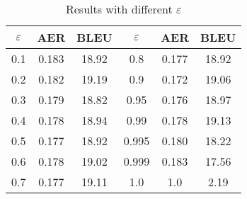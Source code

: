\documentclass[11pt,a4paper]{article}
\begin{document}
\begin{table}[h!]
  \begin{center}
  \begin{tabular}{|c|c|c||c|c|c|}
  \hline 
  $\varepsilon$ & \bf AER &\bf BLEU & $\varepsilon$ & \bf AER &\bf BLEU \\ 
  \hline
  0.1 & 0.183 & 18.92 & 0.8 & 0.177 & 18.92 \\
  \hline
  0.2 & 0.182 & 19.19 & 0.9 & 0.172 & 19.06\\
  \hline
  0.3 & 0.179 & 18.82 & 0.95 & 0.176 & 18.97\\
  \hline
  0.4 & 0.178 & 18.94 & 0.99 & 0.178 & 19.13\\
  \hline
  0.5 & 0.177 & 18.92 & 0.995 & 0.180 & 18.22\\
  \hline
  0.6 & 0.178 & 19.02 & 0.999 & 0.183 & 17.56\\
  \hline
  0.7 & 0.177 & 19.11 & 1.0 & 1.0 & 2.19\\
  \hline
  \end{tabular}
  \end{center}
  \caption{Results with different $\varepsilon$}
  \label{tab:hmm-ep}
\end{table}



\end{document}
